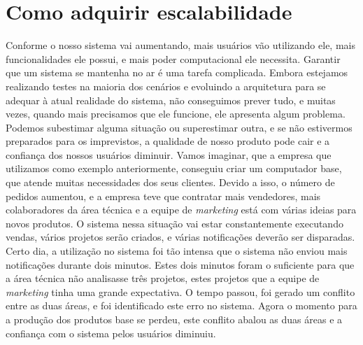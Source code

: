   \section{Como adquirir escalabilidade}
    Conforme o nosso sistema vai aumentando, mais usuários vão utilizando ele,
    mais funcionalidades ele possui, e mais poder computacional ele necessita.
    Garantir que um sistema se mantenha no ar é uma tarefa complicada. Embora
    estejamos realizando testes na maioria dos cenários e evoluindo a arquitetura
    para se adequar à atual realidade do sistema, não conseguimos prever tudo, e
    muitas vezes, quando mais precisamos que ele funcione, ele apresenta algum
    problema. Podemos subestimar alguma situação ou superestimar outra, e se não
    estivermos preparados para os imprevistos, a qualidade de nosso produto pode
    cair e a confiança dos nossos usuários diminuir. \newline
    Vamos imaginar, que a empresa que utilizamos como exemplo anteriormente,
    conseguiu criar um computador base, que atende muitas necessidades dos seus
    clientes. Devido a isso, o número de pedidos aumentou, e a empresa teve que
    contratar mais vendedores, mais colaboradores da área técnica e a equipe de
    \textit{marketing} está com várias ideias para novos produtos. O sistema
    nessa situação vai estar constantemente executando vendas, vários projetos
    serão criados, e várias notificações deverão ser disparadas. Certo dia, a
    utilização no sistema foi tão intensa que o sistema não enviou mais notificações
    durante dois minutos. Estes dois minutos foram o suficiente para que a área
    técnica não analisasse três projetos, estes projetos que a equipe de
    \textit{marketing} tinha uma grande expectativa. O tempo passou, foi gerado
    um conflito entre as duas áreas, e foi identificado este erro no sistema.
    Agora o momento para a produção dos produtos base se perdeu, este conflito
    abalou as duas áreas e a confiança com o sistema pelos usuários diminuiu.

